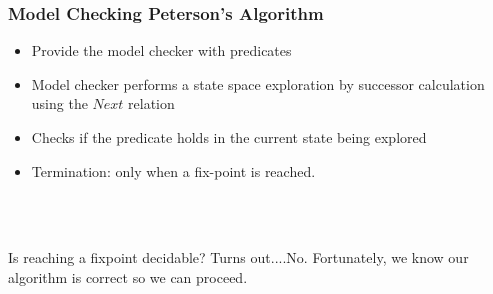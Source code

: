 \documentclass[xcolor=dvipsnames]{beamer}
\begin{document}
\begin{frame}
	\frametitle{Model Checking Peterson's Algorithm}
	\begin{itemize}
		\item Provide the model checker with predicates
		\item Model checker performs a state space exploration by successor calculation using the $Next$ relation
		\item Checks if the predicate holds in the current state being explored
		\item Termination: only when a fix-point is reached.
	\end{itemize}~\\~\\
\begin{alertblock}{Is reaching a fixpoint decidable?}
	Turns out....No. Fortunately, we know our algorithm is correct so we can proceed. 
\end{alertblock}
\end{frame}
\end{document}
